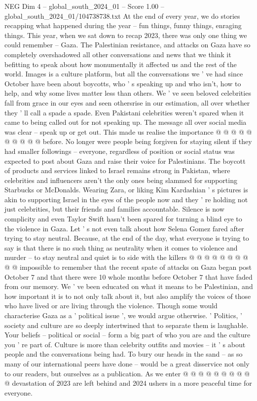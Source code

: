 \begin{textsample}{NEG Dim 4 – global\_south\_2024\_01 – Score 1.00 – global\_south\_2024\_01/104738738.txt}  \label{ex:f4_neg_083}
At the end of every year, we do stories recapping what happened during the year -- fun things, funny things, enraging things.
This year, when we sat down to recap 2023, there was only one thing we could remember -- Gaza.
The Palestinian resistance, and attacks on Gaza have so completely overshadowed all other conversations and news that we think it befitting to speak about how monumentally it affected us and the rest of the world.
Images is a culture platform, but all the conversations we ' ve had since October have been about boycotts, who ' s speaking up and who isn't, how to help, and why some lives matter less than others.
We ' ve seen beloved celebrities fall from grace in our eyes and seen othersrise in our estimation, all over whether they ' ll call a spade a spade.
Even Pakistani celebrities weren't spared when it came to being called out for not speaking up.
The message all over social media was clear -- speak up or get out.
This made us realise the importance @ @ @ @ @ @ @ @ @ @ before.
No longer were people being forgiven for staying silent if they had smaller followings -- everyone, regardless of position or social status was expected to post about Gaza and raise their voice for Palestinians.
The boycott of products and services linked to Israel remains strong in Pakistan, where celebrities and influencers aren't the only ones being slammed for supporting Starbucks or McDonalds.
Wearing Zara, or liking Kim Kardashian ' s pictures is akin to supporting Israel in the eyes of the people now and they ' re holding not just celebrities, but their friends and families accountable.
Silence is now complicity and even Taylor Swift hasn't been spared for turning a blind eye to the violence in Gaza.
Let ' s not even talk about how Selena Gomez fared after trying to stay neutral.
Because, at the end of the day, what everyone is trying to say is that there is no such thing as neutrality when it comes to violence and murder -- to stay neutral and quiet is to side with the killers @ @ @ @ @ @ @ @ @ @ impossible to remember that the recent spate of attacks on Gaza began post October 7 and that there were 10 whole months before October 7 that have faded from our memory.
We ' ve been educated on what it means to be Palestinian, and how important it is to not only talk about it, but also amplify the voices of those who have lived or are living through the violence.
Though some would characterise Gaza as a ' political issue ', we would argue otherwise. ' Politics, ' society and culture are so deeply intertwined that to separate them is laughable.
Your beliefs -- political or social -- form a big part of who you are and the culture you ' re part of.
Culture is more than celebrity outfits and movies -- it ' s about people and the conversations being had.
To bury our heads in the sand -- as so many of our international peers have done -- would be a great disservice not only to our readers, but ourselves as a publication.
As we enter @ @ @ @ @ @ @ @ @ @ devastation of 2023 are left behind and 2024 ushers in a more peaceful time for everyone.

\end{textsample}

